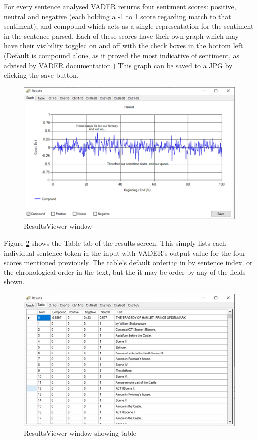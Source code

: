 \documentclass{article}
\begin{document}
        For every sentence analysed VADER returns four sentiment scores: positive, neutral and negative (each holding a -1 to 1 score regarding match to that sentiment), and compound which acts as a single representation for the sentiment in the sentence parsed. Each of these scores have their own graph which may have their visibility toggled on and off with the check boxes in the bottom left. (Default is compound alone, as it proved the most indicative of sentiment, as advised by VADER documentation.) This graph can be saved to a JPG by clicking the save button.
        \begin{figure}[H]
            \includegraphics[width=1\textwidth]{Misc/resultsviewer}
            \caption{ResultsViewer window}
            \label{fig:resultsviewer}
        \end{figure}
        Figure \ref{fig:resultstable} shows the Table tab of the results screen. This simply lists each individual sentence token in the input with VADER’s output value for the four scores mentioned previously. The table’s default ordering in by sentence index, or the chronological order in the text, but the it may be order by any of the fields shown.
        \begin{figure}[H]
            \includegraphics[width=1\textwidth]{Misc/resultstable}
            \caption{ResultsViewer window showing table}
            \label{fig:resultstable}
        \end{figure}
\end{document}
